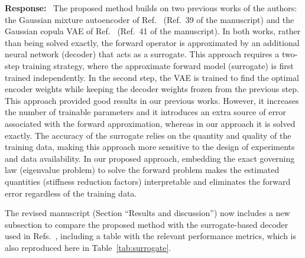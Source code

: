 \documentclass[11pt]{article}
\newenvironment{response}{\par\smallskip\noindent\color{resp}\textbf{Response:}\ }{\par}
\begin{document}
\begin{response}
The proposed method builds on two previous works of the authors: the Gaussian mixture autoencoder of Ref.~\cite{Navamuel_wes2025} (Ref.~39 of the manuscript) and the Gaussian copula VAE of Ref.~\cite{Arxiv_Navamuel2026copula2d} (Ref.~41 of the manuscript).
In both works, rather than being solved exactly, the forward operator is approximated by an additional neural network (decoder) that acts as a surrogate. 
This approach requires a two-step training strategy, where the approximate forward model (surrogate) is first trained independently. 
In the second step, the VAE is trained to find the optimal encoder weights while keeping the decoder weights frozen from the previous step. 
This approach provided good results in our previous works. 
However, it increases the number of trainable parameters and it introduces an extra source of error associated with the forward approximation, whereas in our approach it is solved exactly. 
The accuracy of the surrogate relies on the quantity and quality of the training data, making this approach more sensitive to the design of experiments and data availability.  
In our proposed approach, embedding the exact governing law (eigenvalue problem) to solve the forward problem makes the estimated quantities (stiffness reduction factors) interpretable and eliminates the forward error regardless of the training data. 

The revised manuscript (Section ``Results and discussion'') now includes a new subsection to compare the proposed method with the surrogate-based decoder used in Refs.~\cite{Navamuel_wes2025,Arxiv_Navamuel2026copula2d}, including a table with the relevant performance metrics, which is also reproduced here in Table~\ref{tab:surrogate}.



\end{response}
\end{document}

